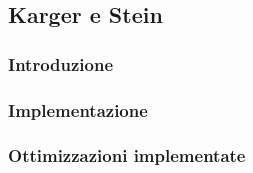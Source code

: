 \subsection{Karger e Stein}

\subsubsection{Introduzione}

\subsubsection{Implementazione}

\subsubsection{Ottimizzazioni implementate}
